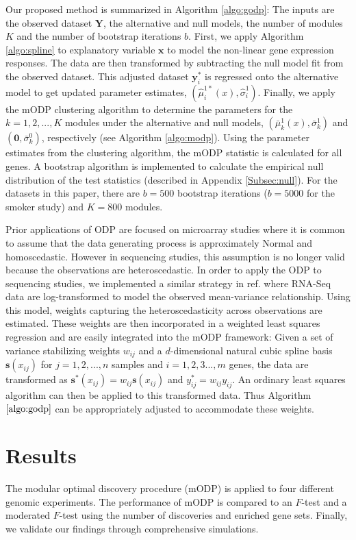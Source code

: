 \documentclass[11pt]{article}
\begin{document}
Our proposed method is summarized in Algorithm \ref{algo:godp}: The inputs are the observed dataset $\mathbf{Y}$, the alternative and null models, the number of modules $K$ and the number of bootstrap iterations $b$. First, we apply Algorithm \ref{algo:spline} to explanatory variable $\mathbf{x}$ to model the non-linear gene expression responses. The data are then transformed by subtracting the null model fit from the observed dataset. This adjusted dataset $\mathbf{y}_{i}^{*}$ is regressed onto the alternative model to get updated parameter estimates, $(\hat{\mu}^{1*}_{i}(x), \hat{\sigma}_{i}^{1})$. Finally, we apply the mODP clustering algorithm to determine the parameters for the $k = 1,2,...,K$ modules under the alternative and null models, $(\bar{\mu}^{1}_{k}(x), \bar{\sigma}_{k}^{1})$ and $(\mathbf{0}, \bar{\sigma}_{k}^{0})$, respectively (see Algorithm \ref{algo:modp}). Using the parameter estimates from the clustering algorithm, the mODP statistic is calculated for all genes. A bootstrap algorithm is implemented to calculate the empirical null distribution of the test statistics (described in Appendix \ref{Subsec:null}). For the datasets in this paper, there are $b=500$ bootstrap iterations ($b=5000$ for the smoker study) and $K = 800$ modules.

Prior applications of ODP are focused on microarray studies where it is common to assume that the data generating process is approximately Normal and homoscedastic. However in sequencing studies, this assumption is no longer valid because the observations are heteroscedastic. In order to apply the ODP to sequencing studies, we implemented a similar strategy in ref. \cite{law2014voom} where RNA-Seq data are log-transformed to model the observed mean-variance relationship. Using this model, weights capturing the heteroscedasticity across observations are estimated. These weights are then incorporated in a weighted least squares regression and are easily integrated into the mODP framework: Given a set of variance stabilizing weights $w_{ij}$ and a $d$-dimensional natural cubic spline basis $\mathbf{s}(x_{ij})$ for $j = 1,2,...,n$ samples and $i = 1,2,3...,m$ genes, the data are transformed as $\mathbf{s}^{*}(x_{ij}) = w_{ij} \mathbf{s}(x_{ij})$ and $y_{ij}^{*} = w_{ij} y_{ij}$. An ordinary least squares algorithm can then be applied to this transformed data. Thus Algorithm $\ref{algo:godp}$ can be appropriately adjusted to accommodate these weights.

\section{Results\label{Sec:results}}
\label{sec:results}
The modular optimal discovery procedure (mODP) is applied to four different genomic experiments. The performance of mODP is compared to an $F$-test and a moderated $F$-test \citep{smyth2004linear} using the number of discoveries and enriched gene sets. Finally, we validate our findings through comprehensive simulations.
\end{document}
